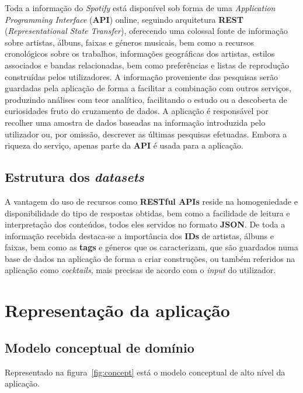 \documentclass[twocolumn,twoside,11pt,a4paper]{article}
\begin{document}
Toda a informação do \textit{Spotify} está disponível sob forma de uma
\textit{Application Programming Interface} (\textbf{API}) online, seguindo arquitetura
\textbf{REST} (\textit{Representational State Transfer}), oferecendo uma
colossal fonte de informação sobre artistas, álbuns, faixas e géneros musicais, bem
como a recursos cronológicos sobre os trabalhos, informações geográficas dos
artistas, estilos associados e bandas relacionadas, bem como preferências e listas de
reprodução construídas pelos utilizadores.
A informação proveniente das pesquisas serão guardadas pela aplicação de forma a facilitar
a combinação com outros serviços, produzindo análises com teor analítico, facilitando o
estudo ou a descoberta de curiosidades fruto do cruzamento de dados.
A aplicação é responsável por recolher uma amostra de dados baseadas na informação introduzida
pelo utilizador ou, por omissão, descrever as últimas pesquisas efetuadas.
Embora a riqueza do serviço, apenas parte da \textbf{API} é usada para a aplicação. \\

\subsection{Estrutura dos \textit{datasets}}

A vantagem do uso de recursos como \textbf{RESTful APIs} reside na homogeniedade e disponibilidade
do tipo de respostas obtidas, bem como a facilidade de leitura e interpretação dos conteúdos, todos
eles servidos no formato \textbf{JSON}.
De toda a informação recebida destaca-se a importância dos \textbf{IDs} de artistas, álbuns e faixas, bem como as \textbf{tags} e géneros que os caracterizam, que são guardados numa base de
dados na aplicação de forma a criar construções, ou também referidos na aplicação como \textit{cocktails}, mais precisas de acordo com o \textit{input} do utilizador.


\section{Representação da aplicação}\label{sec:app_model}

\subsection{Modelo conceptual de domínio}

Representado na figura~\ref{fig:concept} está o modelo conceptual de alto nível da aplicação.
\end{document}
